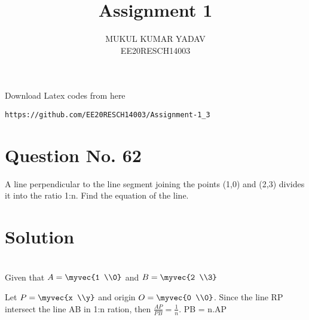 \documentclass[journal,12pt,twocolumn]{IEEEtran}
\begin{document}
     \def\rightbox#1{\makebox[0in][r]{#1}}
     \def\centbox#1{\makebox[0in]{#1}}
     \def\topbox#1{\raisebox{-\baselineskip}[0in][0in]{#1}}
     \def\midbox#1{\raisebox{-0.5\baselineskip}[0in][0in]{#1}}
\vspace{3cm}
\title{Assignment 1}
\author{MUKUL KUMAR YADAV\\ EE20RESCH14003}
\maketitle
\newpage
\bigskip
\renewcommand{\thefigure}{\theenumi}
\renewcommand{\thetable}{\theenumi}
 Download Latex codes from here
\begin{lstlisting}
https://github.com/EE20RESCH14003/Assignment-1_3
\end{lstlisting}
%

%

%
\section{Question No. 62}
A line perpendicular to the line segment joining the points (1,0) and (2,3) divides it into the ratio 1:n. Find the equation of the line.

\section{Solution}

\begin{center}
    
\end{center} \\
Given that
$A=\myvec{1 \\0} $ and $ B= \myvec{2 \\3}$

Let $ P= \myvec{x \\y} $ and origin $ O = \myvec{0 \\0}$. Since the line RP intersect the line AB in 1:n ration, then 
$ \frac{AP}{PB} = \frac{1}{n} $. PB = n.AP \\
\end{document}
